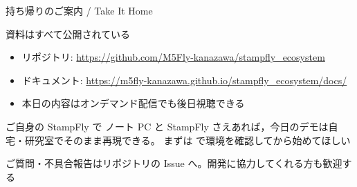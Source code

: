 \begin{frame}{持ち帰りのご案内 / Take It Home}
  \begin{exampleblock}{資料はすべて公開されている}\small
    \begin{itemize}
      \item リポジトリ: \url{https://github.com/M5Fly-kanazawa/stampfly_ecosystem}
      \item ドキュメント: \url{https://m5fly-kanazawa.github.io/stampfly_ecosystem/docs/}
      \item 本日の内容はオンデマンド配信でも後日視聴できる
    \end{itemize}
  \end{exampleblock}

  \vspace{0.15em}

  \begin{block}{ご自身の StampFly で}\small
    ノート PC と StampFly さえあれば，今日のデモは自宅・研究室でそのまま再現できる。
    まずは  で環境を確認してから始めてほしい
  \end{block}

  \vspace{0.15em}

  {\small ご質問・不具合報告はリポジトリの Issue へ。開発に協力してくれる方も歓迎する}
\end{frame}

